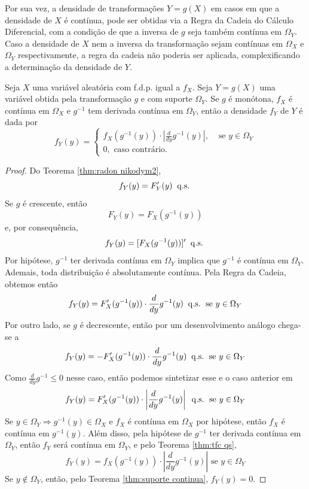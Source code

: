 Por sua vez, a densidade de transformações $Y=g(X)$ em casos em que a densidade de $X$
é contínua, pode ser obtidas via a Regra da Cadeia do Cálculo Diferencial, com a
condição de que a inversa de $g$ seja também contínua em $\Omega_Y$.
Caso a densidade de $X$ nem a inversa da transformação sejam contínuas em $\Omega_X$ e
$\Omega_Y$ respectivamente, a regra da cadeia não poderia ser aplicada, complexificando
a determinação da densidade de $Y$.

\begin{thm:fdp transformacao continua}
\label{thm:fdp transformacao continua}
Seja $X$ uma variável aleatória com f.d.p. igual a $f_X$.
Seja $Y=g(X)$ uma variável obtida pela transformação $g$ e com suporte $\Omega_Y$.
Se $g$ é monótona, $f_X$ é contínua em $\Omega_X$ e $g^{-1}$ tem
derivada contínua em $\Omega_Y$, então a densidade $f_Y$ de $Y$ é dada por
\[
	f_{Y}(y) = \begin{cases}
		f_{X}(g^{-1}(y)) \cdot \left| \frac{d}{dy} g^{-1}(y)\right|, & \text{ se } y \in \Omega_{Y} \\
		0, \text{ caso contrário.}
	\end{cases}
\]
\begin{proof}
	Do Teorema \ref{thm:radon nikodym2},
	\[
		f_Y(y) = F_Y'(y) \;\;\mathrm{q.s.}\;
	\]
	Se $g$ é crescente, então
	\[
		F_Y(y) = F_X(g^{-1}(y))
	\]
	e, por consequência,
	\[
		f_Y(y) = [F_X(g^{-1}(y))]' \;\;\mathrm{q.s.}\;
	\]
	Por hipótese, $g^{-1}$ ter derivada contínua em $\Omega_Y$ implica que $g^{-1}$ é
	contínua em $\Omega_Y$. Ademais, toda distribuição é absolutamente contínua.
	Pela Regra da Cadeia, obtemos então
	\[
		f_Y(y) = F_X'(g^{-1}(y)) \cdot \frac{d}{dy}g^{-1}(y) \;\;\mathrm{q.s.}\; \text{ se } y \in \Omega_Y
	\]
	Por outro lado, se $g$ é decrescente, então por um desenvolvimento análogo chega-se
	a
	\[
		f_Y(y) = - F_X'(g^{-1}(y)) \cdot \frac{d}{dy}g^{-1}(y) \;\;\mathrm{q.s.}\; \text{ se } y \in \Omega_Y
	\]
	Como $\frac{d}{dy}g^{-1} \le 0$ nesse caso, então podemos sintetizar esse e o caso
	anterior em
	\[
		f_Y(y) = F_X'(g^{-1}(y)) \cdot \left|\frac{d}{dy}g^{-1}(y)\right| \;\;\mathrm{q.s.}\; \text{ se } y \in \Omega_Y
	\]
	Se $y \in \Omega_Y \Longrightarrow g^{-1}(y) \in \Omega_X$ e $f_X$ é contínua
	em $\Omega_X$ por hipótese, então $f_X$ é contínua em $g^{-1}(y)$.
	Além disso, pela hipótese de $g^{-1}$ ter derivada contínua em $\Omega_Y$, então
	$f_Y$ será contínua em $\Omega_Y$, e pelo Teorema \ref{thm:tfc qs},
	\[
		f_Y(y) = f_X(g^{-1}(y)) \cdot \left|\frac{d}{dy}g^{-1}(y)\right| \text{ se } y \in \Omega_Y
	\]
	Se $y \notin \Omega_Y$, então, pelo Teorema \ref{thm:suporte continua}, $f_Y(y) = 0$.
\end{proof}
\end{thm:fdp transformacao continua}

